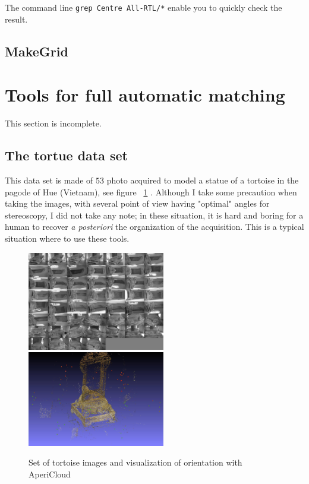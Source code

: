 The command line {\tt grep Centre All-RTL/*} enable you to quickly check the result.


\subsection{MakeGrid}
\label{MAKEGRID}





\section{Tools for full automatic  matching}

This section is incomplete.

\label{FullAutoMatch}

\subsection{The tortue data set}

This data set is made  of $53$ photo acquired to model a statue of a tortoise in the
pagode of Hue (Vietnam), see figure ~\ref{FIG:Tortue:Input} . Although I take some precaution when taking the images,
with several point of view having "optimal" angles for stereoscopy, I did not take any
note; in these situation,  it is hard and boring for a human to recover \emph{a posteriori} the organization
of the acquisition. This is a typical situation where to use these tools.


\begin{figure}
\begin{center}
\includegraphics[width=60mm]{FIGS/Tortue/AllTortues.jpg}
\includegraphics[width=60mm]{FIGS/Tortue/AP-snapshot00.jpg}
\end{center}
\caption{Set of tortoise images and visualization of orientation with AperiCloud}
\label{FIG:Tortue:Input}
\end{figure}




